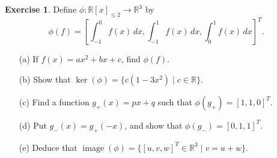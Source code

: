 \documentclass{amsart}
\newcommand{\R}         {{\mathbb{R}}}
\newcommand{\img}       {\operatorname{image}}
\newcommand{\st}        {\;|\;}
\renewcommand{\:}       {\colon}
\theoremstyle{definition}
\newtheorem{exercise}{Exercise}[section]
\begin{document}
\begin{exercise}
 Define $\phi\:\R[x]_{\leq 2}\to\R^3$ by 
 \[ \phi(f) =
      \left[ \int_{-1}^0 f(x)\,dx, 
             \int_{-1}^1 f(x)\,dx,
             \int_0^1    f(x)\,dx \right]^T.
 \]
 \begin{itemize}
  \item[(a)] If $f(x)=ax^2+bx+c$, find $\phi(f)$.
  \item[(b)] Show that $\ker(\phi)=\{c(1-3x^2)\st c\in\R\}$.
  \item[(c)] Find a function $g_+(x)=px+q$ such that
   $\phi(g_+)=[1,1,0]^T$.
  \item[(d)] Put $g_-(x)=g_+(-x)$, and show that
   $\phi(g_-)=[0,1,1]^T$. 
  \item[(e)] Deduce that $\img(\phi)=\{[u,v,w]^T\in\R^3\st v=u+w\}$.
 \end{itemize}
\end{exercise}
\end{document}
